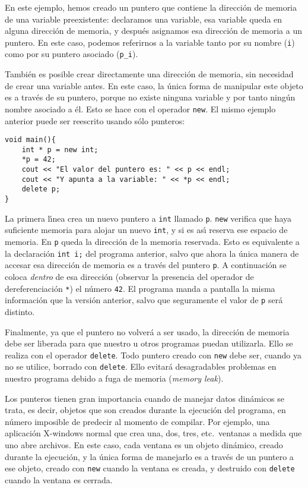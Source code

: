 En este ejemplo, hemos creado un puntero que contiene la direcci\'on
de memoria de una variable preexistente: declaramos una variable, esa
variable queda en alguna direcci\'on de memoria, y despu\'es asignamos
esa direcci\'on de memoria a un puntero. En este caso, podemos
referirnos a la variable tanto por su nombre (\verb+i+) como por su
puntero asociado (\verb+p_i+).

Tambi\'en es posible crear directamente una direcci\'on de memoria,
sin necesidad de crear una variable antes. En este caso, la \'unica
forma de manipular este objeto es a trav\'es de su puntero, porque no
existe ninguna variable y por tanto ning\'un nombre asociado a \'el.
Esto se hace con el operador \verb+new+. El mismo ejemplo anterior
puede ser reescrito usando s\'olo punteros:
\begin{verbatim}
void main(){
    int * p = new int;
    *p = 42;
    cout << "El valor del puntero es: " << p << endl;
    cout << "Y apunta a la variable: " << *p << endl;
    delete p;
}
\end{verbatim}

La primera l\'{\i}nea crea un nuevo puntero a \verb+int+ llamado
\verb+p+. \verb+new+ verifica que haya suficiente memoria para alojar
un nuevo \verb+int+, y si es as\'{\i} reserva ese espacio de
memoria. En \verb+p+ queda la direcci\'on de la memoria
reservada. Esto es equivalente a la declaraci\'on \verb+int i;+ del
programa anterior, salvo que ahora la \'unica manera de accesar esa
direcci\'on de memoria es a trav\'es del puntero \verb+p+. A
continuaci\'on se coloca {\em dentro\/} de esa direcci\'on (observar
la presencia del operador de dereferenciaci\'on \verb+*+) el n\'umero
\verb+42+. El programa manda a pantalla la misma informaci\'on que la
versi\'on anterior, salvo que seguramente el valor de \verb+p+ ser\'a
distinto. 

Finalmente, ya que el puntero no volver\'a a ser usado, la direcci\'on
de memoria debe ser liberada para que nuestro u otros programas puedan
utilizarla. Ello se realiza con el operador \verb+delete+. Todo
puntero creado con \verb+new+ debe ser, cuando ya no se utilice,
borrado con \verb+delete+. Ello evitar\'a desagradables problemas en
nuestro programa debido a fuga de memoria ({\em memory leak\/}). 



Los punteros tienen gran importancia cuando de manejar datos
din{\'a}micos se trata, es decir, objetos que son creados durante la
ejecuci{\'o}n del programa, en n{\'u}mero imposible de predecir al
momento de compilar. Por ejemplo, una aplicaci{\'o}n X-windows normal que
crea una, dos, tres, etc.\ ventanas a medida que uno abre archivos.
En este caso, cada ventana es un objeto din{\'a}mico, creado durante la
ejecuci{\'o}n, y la {\'u}nica forma de manejarlo es a trav{\'e}s
de un puntero a ese objeto, creado con \verb+new+ cuando la ventana es
creada, y destruido con \verb+delete+ cuando la ventana es cerrada. 


